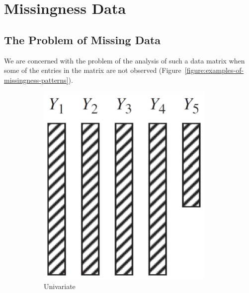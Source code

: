 \chapter{Missingness Data}

\section{The Problem of Missing Data}

We are concerned with the problem of the analysis of such a data matrix when some of the entries in the matrix are not observed (Figure~\ref{figure:examples-of-missingness-patterns}).

\begin{figure}[hpt]
	\centering
	\begin{subfigure}{.25\textwidth}
		\centering
		\includegraphics[width=\linewidth]{statistics-applications/figures/univariate-nonresponse.png}
		\caption{Univariate}
	\end{subfigure}
	\quad
	\begin{subfigure}{.25\textwidth}
		\centering

\end{subfigure}
\end{figure}
